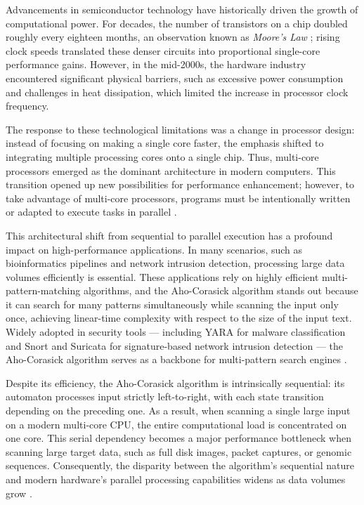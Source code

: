 Advancements in semiconductor technology have historically driven the growth of computational power. For decades, the number of transistors on a chip doubled roughly every eighteen months, an observation known as \textit{Moore's Law} \cite{Pacheco2011}; rising clock speeds translated these denser circuits into proportional single-core performance gains. However, in the mid-2000s, the hardware industry encountered significant physical barriers, such as excessive power consumption and challenges in heat dissipation, which limited the increase in processor clock frequency.

The response to these technological limitations was a change in processor design: instead of focusing on making a single core faster, the emphasis shifted to integrating multiple processing cores onto a single chip. Thus, multi-core processors emerged as the dominant architecture in modern computers. This transition opened up new possibilities for performance enhancement; however, to take advantage of multi-core processors, programs must be intentionally written or adapted to execute tasks in parallel \cite{Pacheco2011}.

This architectural shift from sequential to parallel execution has a profound impact on high-performance applications. In many scenarios, such as bioinformatics pipelines and network intrusion detection, processing large data volumes efficiently is essential.
These applications rely on highly efficient multi-pattern-matching algorithms, and the Aho-Corasick algorithm stands out because it can search for many patterns simultaneously while scanning the input only once, achieving linear-time complexity with respect to the size of the input text. Widely adopted in security tools --- including YARA for malware classification and Snort and Suricata for signature-based network intrusion detection \cite{LeeYang2017FHBM} --- the Aho-Corasick algorithm serves as a backbone for multi-pattern search engines \cite{YARADocs}.

Despite its efficiency, the Aho-Corasick algorithm is intrinsically sequential: its automaton processes input strictly left-to-right, with each state transition depending on the preceding one. As a result, when scanning a single large input on a modern multi-core CPU, the entire computational load is concentrated on one core. This serial dependency becomes a major performance bottleneck when scanning large target data, such as full disk images, packet captures, or genomic sequences. Consequently, the disparity between the algorithm's sequential nature and modern hardware's parallel processing capabilities widens as data volumes grow \cite{AhoCorasick1975}.

